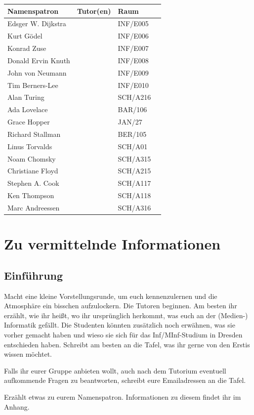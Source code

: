 \documentclass[a4paper,12pt]{report}
\begin{document}
\begin{center}
\vspace{1cm}
\begin{tabular}[h]{|l|l|l|l|}
	\hline
	\textbf{Namenspatron} & \textbf{Tutor(en)} & \textbf{Raum}\\ \hline
	Edsger W. Dijkstra & 	   	& INF/E005\\
	Kurt Gödel & 				& INF/E006\\
	Konrad Zuse & 			& INF/E007\\
	Donald Ervin Knuth & 	     & INF/E008\\
	John von Neumann & 		& INF/E009\\
	Tim Berners-Lee &     	& INF/E010\\
	Alan Turing &	        & SCH/A216\\
	Ada Lovelace & 			& BAR/106\\
	Grace Hopper & 			& JAN/27\\
	Richard Stallman &			& BER/105\\
	Linus Torvalds & 			& SCH/A01\\
	Noam Chomsky & 			& SCH/A315\\
	Christiane Floyd & 			& SCH/A215\\
	Stephen A. Cook & 			& SCH/A117\\
	Ken Thompson & 			& SCH/A118\\
	Marc Andreessen & 		& SCH/A316\\
	\hline
\end{tabular}
\end{center}

\chapter{Zu vermittelnde Informationen}

\section{Einführung}
\begin{itemize*}
\item Macht eine kleine Vorstellungsrunde, um euch kennenzulernen und die Atmosphäre ein bisschen aufzulockern. 
Die Tutoren beginnen. 
Am besten ihr erzählt, wie ihr heißt, wo ihr ursprünglich herkommt, was euch an der (Medien-) Informatik gefällt. 
Die Studenten könnten zusätzlich noch erwähnen, was sie vorher gemacht haben und wieso sie sich für das Inf/MInf-Studium in Dresden entschieden haben. 
Schreibt am besten an die Tafel, was ihr gerne von den Erstis wissen möchtet.
\item Falls ihr eurer Gruppe anbieten wollt, auch nach dem Tutorium eventuell aufkommende Fragen zu beantworten, schreibt eure Emailadressen an die Tafel.
\item Erzählt etwas zu eurem Namenspatron. Informationen zu diesem findet ihr im Anhang.
\end{itemize*}
\end{document}
